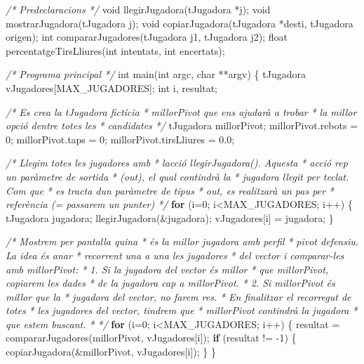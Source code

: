 \documentclass[
]{book}
\newenvironment{Shaded}{\begin{snugshade}}{\end{snugshade}}
\newcommand{\CommentTok}[1]{\textcolor[rgb]{0.56,0.35,0.01}{\textit{#1}}}
\newcommand{\ControlFlowTok}[1]{\textcolor[rgb]{0.13,0.29,0.53}{\textbf{#1}}}
\newcommand{\DataTypeTok}[1]{\textcolor[rgb]{0.13,0.29,0.53}{#1}}
\newcommand{\DecValTok}[1]{\textcolor[rgb]{0.00,0.00,0.81}{#1}}
\newcommand{\FloatTok}[1]{\textcolor[rgb]{0.00,0.00,0.81}{#1}}
\newcommand{\NormalTok}[1]{#1}
\begin{document}
\begin{Shaded}
\begin{Highlighting}[]
\CommentTok{/* Predeclaracions */}
\DataTypeTok{void}\NormalTok{ llegirJugadora(tJugadora *j);}
\DataTypeTok{void}\NormalTok{ mostrarJugadora(tJugadora j);}
\DataTypeTok{void}\NormalTok{ copiarJugadora(tJugadora *desti, tJugadora origen);}
\DataTypeTok{int}\NormalTok{ compararJugadores(tJugadora j1, tJugadora j2);}
\DataTypeTok{float}\NormalTok{ percentatgeTirsLliures(}\DataTypeTok{int}\NormalTok{ intentats, }\DataTypeTok{int}\NormalTok{ encertats);}

\CommentTok{/* Programa principal */}
\DataTypeTok{int}\NormalTok{ main(}\DataTypeTok{int}\NormalTok{ argc, }\DataTypeTok{char}\NormalTok{ **argv) \{}
\NormalTok{    tJugadora vJugadores[MAX\_JUGADORES];}
    \DataTypeTok{int}\NormalTok{ i, resultat;}

    \CommentTok{/* Es crea la tJugadora fictícia }
\CommentTok{     * millorPivot que ens ajudarà a trobar }
\CommentTok{     * la millor opció d\textquotesingle{}entre totes les }
\CommentTok{     * candidates}
\CommentTok{     */}
\NormalTok{    tJugadora millorPivot;    }
\NormalTok{    millorPivot.rebots = }\DecValTok{0}\NormalTok{;}
\NormalTok{    millorPivot.taps = }\DecValTok{0}\NormalTok{;}
\NormalTok{    millorPivot.tirsLliures = }\FloatTok{0.0}\NormalTok{;}

    \CommentTok{/* Llegim totes les jugadores amb }
\CommentTok{     * l\textquotesingle{}acció llegirJugadora(). Aquesta}
\CommentTok{     * acció rep un paràmetre de sortida}
\CommentTok{     * (out), el qual contindrà la }
\CommentTok{     * jugadora llegit per teclat. Com que}
\CommentTok{     * es tracta d\textquotesingle{}un paràmetre de tipus }
\CommentTok{     * out, es realitzarà un pas per }
\CommentTok{     * referència (= passarem un punter)}
\CommentTok{     */}
    \ControlFlowTok{for}\NormalTok{ (i=}\DecValTok{0}\NormalTok{; i\textless{}MAX\_JUGADORES; i++) \{}
\NormalTok{        tJugadora jugadora;}
\NormalTok{        llegirJugadora(\&jugadora);}
\NormalTok{        vJugadores[i] = jugadora;}
\NormalTok{    \}}
    
    \CommentTok{/* Mostrem per pantalla quina}
\CommentTok{     * és la millor jugadora amb perfil}
\CommentTok{     * pivot defensiu. La idea és anar}
\CommentTok{     * recorrent una a una les jugadores}
\CommentTok{     * del vector i comparar{-}les amb millorPivot:}
\CommentTok{     * 1. Si la jugadora del vector és millor}
\CommentTok{     *    que millorPivot, copiarem les dades}
\CommentTok{     *    de la jugadora cap a millorPivot.}
\CommentTok{     * 2. Si millorPivot és millor que la}
\CommentTok{     *    jugadora del vector, no farem res.}
\CommentTok{     * En finalitzar el recorregut de totes}
\CommentTok{     * les jugadores del vector, tindrem que}
\CommentTok{     * millorPivot contindrà la jugadora}
\CommentTok{     * que estem buscant.}
\CommentTok{     * */}
    \ControlFlowTok{for}\NormalTok{ (i=}\DecValTok{0}\NormalTok{; i\textless{}MAX\_JUGADORES; i++) \{}
\NormalTok{        resultat = compararJugadores(millorPivot, vJugadores[i]);}
        \ControlFlowTok{if}\NormalTok{ (resultat != {-}}\DecValTok{1}\NormalTok{) \{}
\NormalTok{            copiarJugadora(\&millorPivot, vJugadores[i]);}
\NormalTok{        \}}
\NormalTok{    \}}
    

\end{Highlighting}
\end{Shaded}
\end{document}
